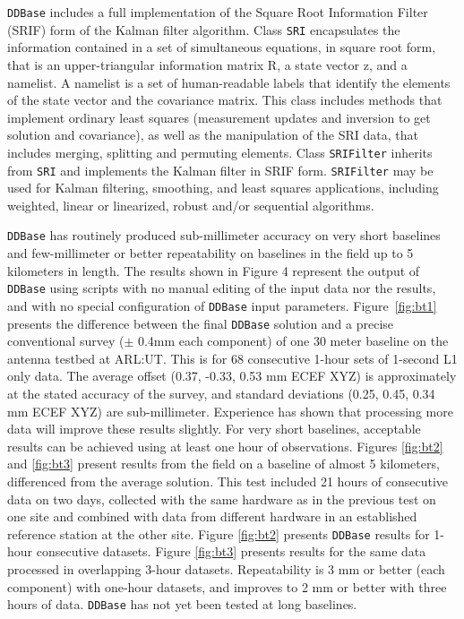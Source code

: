 \documentclass{ion-gps}
\newcommand{\gpstkapplication}[1]{\texttt{#1}}
\newcommand{\gpstkclass}[1]{\texttt{#1}}
\begin{document}
\gpstkapplication{DDBase} includes a full implementation of the Square
Root Information Filter (SRIF) form of the Kalman filter
algorithm\cite{biermann}.  Class \gpstkclass{SRI} encapsulates the
information contained in a set of simultaneous equations, in square
root form, that is an upper-triangular information matrix R, a
state vector z, and a namelist. A namelist is a set of
human-readable labels that identify the elements of the state vector
and the covariance matrix. This class includes methods that implement
ordinary least squares (measurement updates and inversion to get
solution and covariance), as well as the manipulation of the SRI data,
that includes merging, splitting and permuting elements. Class
\gpstkclass{SRIFilter} inherits from \gpstkclass{SRI} and implements
the Kalman filter in SRIF form. \gpstkclass{SRIFilter} may be used for
Kalman filtering, smoothing, and least squares applications, including
weighted, linear or linearized, robust and/or sequential algorithms.

\gpstkapplication{DDBase} has routinely produced sub-millimeter
accuracy on very short baselines and few-millimeter or better
repeatability on baselines in the field up to 5 kilometers in
length. The results shown in Figure 4 represent the output of
\gpstkapplication{DDBase} using scripts with no manual editing of the
input data nor the results, and with no special configuration of
\gpstkapplication{DDBase} input parameters. Figure~\ref{fig:bt1}
presents the difference between the final \gpstkapplication{DDBase}
solution and a precise conventional survey ($\pm$ 0.4mm each component)
of one 30 meter baseline on the antenna testbed at ARL:UT. This is for
68 consecutive 1-hour sets of 1-second L1 only data. The average
offset (0.37, -0.33, 0.53 mm ECEF XYZ) is approximately at the stated
accuracy of the survey, and standard deviations (0.25, 0.45, 0.34 mm
ECEF XYZ) are sub-millimeter. Experience has shown that processing
more data will improve these results slightly. For very short baselines, 
acceptable results can be achieved using at least one hour of observations.  
Figures \ref{fig:bt2} and \ref{fig:bt3} present results from the field on a
baseline of almost 5 kilometers, differenced from the average
solution. This test included 21 hours of consecutive data on two days,
collected with the same hardware as in the previous test on one site and
combined with data from different hardware in an established reference
station at the other site. Figure \ref{fig:bt2} presents
\gpstkapplication{DDBase} results for 1-hour consecutive datasets.
Figure \ref{fig:bt3} presents results for the same data
processed in overlapping 3-hour datasets. Repeatability is 3 mm or
better (each component) with one-hour datasets, and improves to 2 mm
or better with three hours of data. \gpstkapplication{DDBase} has not
yet been tested at long baselines.
\end{document}
